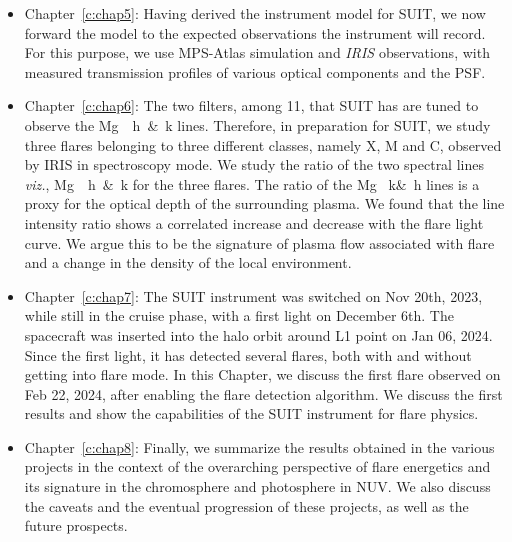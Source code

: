 \begin{itemize}
	\item Chapter~\ref{c:chap5}: Having derived the instrument model for SUIT, we now forward the model to the expected observations the instrument will record.  For this purpose, we use MPS-Atlas simulation and {\it IRIS} observations, with measured transmission profiles of various optical components and the PSF.
	
	
	\item Chapter~\ref{c:chap6}: The two filters, among 11, that SUIT has are tuned to observe the Mg~~h~\&~k lines. Therefore, in preparation for SUIT, we study three flares belonging to three different classes, namely X, M and C, observed by IRIS in spectroscopy mode. We study the ratio of the two spectral lines \textit{viz.}, Mg~~h~\&~k for the three flares. The ratio of the Mg ~k\&~h lines is a proxy for the optical depth of the surrounding plasma. We found that the line intensity ratio shows a correlated increase and decrease with the flare light curve. We argue this to be the signature of plasma flow associated with flare and a change in the density of the local environment. %
	
	\item Chapter~\ref{c:chap7}: The SUIT instrument was switched on Nov 20th, 2023, while still in the cruise phase, with a first light on December 6th. The spacecraft was inserted into the halo orbit around L1 point on Jan 06, 2024. Since the first light, it has detected several flares, both with and without getting into flare mode. In this Chapter, we discuss the first flare observed on Feb 22, 2024, after enabling the flare detection algorithm. We discuss the first results and show the capabilities of the SUIT instrument for flare physics.

    \item Chapter~\ref{c:chap8}: Finally, we summarize the results obtained in the various projects in the context of the overarching perspective of flare energetics and its signature in the chromosphere and photosphere in NUV. We also discuss the caveats and the eventual progression of these projects, as well as the future prospects.
	
	
\end{itemize}


